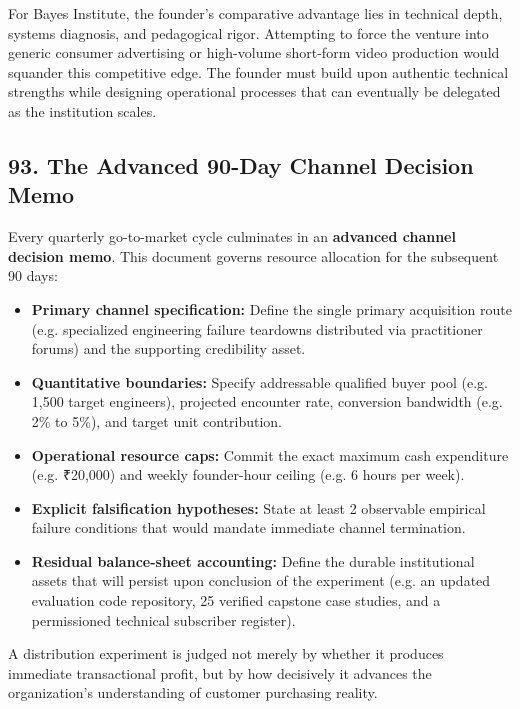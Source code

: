 For Bayes Institute, the founder's comparative advantage lies in technical depth, systems diagnosis, and pedagogical rigor. Attempting to force the venture into generic consumer advertising or high-volume short-form video production would squander this competitive edge. The founder must build upon authentic technical strengths while designing operational processes that can eventually be delegated as the institution scales.

\subsection*{93. The Advanced 90-Day Channel Decision Memo}

Every quarterly go-to-market cycle culminates in an \textbf{advanced channel decision memo}. This document governs resource allocation for the subsequent 90 days:
\begin{itemize}[leftmargin=*,itemsep=1pt]
  \item \textbf{Primary channel specification:} Define the single primary acquisition route (e.g. specialized engineering failure teardowns distributed via practitioner forums) and the supporting credibility asset.
  \item \textbf{Quantitative boundaries:} Specify addressable qualified buyer pool (e.g. 1,500 target engineers), projected encounter rate, conversion bandwidth (e.g. 2\% to 5\%), and target unit contribution.
  \item \textbf{Operational resource caps:} Commit the exact maximum cash expenditure (e.g. ₹20,000) and weekly founder-hour ceiling (e.g. 6 hours per week).
  \item \textbf{Explicit falsification hypotheses:} State at least 2 observable empirical failure conditions that would mandate immediate channel termination.
  \item \textbf{Residual balance-sheet accounting:} Define the durable institutional assets that will persist upon conclusion of the experiment (e.g. an updated evaluation code repository, 25 verified capstone case studies, and a permissioned technical subscriber register).
\end{itemize}

A distribution experiment is judged not merely by whether it produces immediate transactional profit, but by how decisively it advances the organization's understanding of customer purchasing reality.
